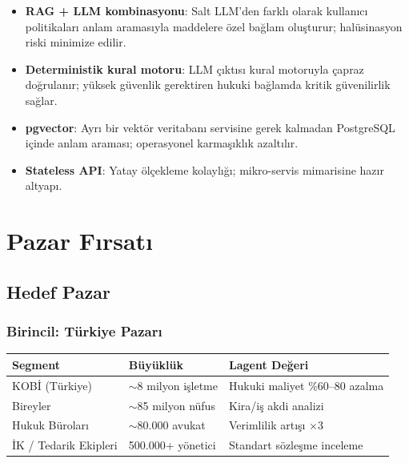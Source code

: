 \documentclass[12pt,a4paper]{article}
\begin{document}
\begin{itemize}[itemsep=4pt]
  \item \textbf{RAG + LLM kombinasyonu}: Salt LLM'den farklı olarak kullanıcı politikaları anlam
  aramasıyla maddelere özel bağlam oluşturur; halüsinasyon riski minimize edilir.
  \item \textbf{Deterministik kural motoru}: LLM çıktısı kural motoruyla çapraz doğrulanır;
  yüksek güvenlik gerektiren hukuki bağlamda kritik güvenilirlik sağlar.
  \item \textbf{pgvector}: Ayrı bir vektör veritabanı servisine gerek kalmadan PostgreSQL içinde
  anlam araması; operasyonel karmaşıklık azaltılır.
  \item \textbf{Stateless API}: Yatay ölçekleme kolaylığı; mikro-servis mimarisine hazır altyapı.
\end{itemize}

\section{Pazar Fırsatı}

\subsection{Hedef Pazar}

\subsubsection{Birincil: Türkiye Pazarı}

\begin{statbox}
\begin{tabular}{p{5cm} p{3.5cm} p{5cm}}
\textbf{Segment} & \textbf{Büyüklük} & \textbf{Lagent Değeri} \\
\midrule
KOBİ (Türkiye) & $\sim$8 milyon işletme & Hukuki maliyet \%60–80 azalma \\
Bireyler & $\sim$85 milyon nüfus & Kira/iş akdi analizi \\
Hukuk Büroları & $\sim$80.000 avukat & Verimlilik artışı $\times$3 \\
İK / Tedarik Ekipleri & 500.000+ yönetici & Standart sözleşme inceleme \\
\end{tabular}
\end{statbox}
\end{document}
